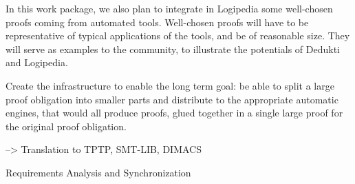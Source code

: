 \begin{workpackage}[id=atpetc,wphases=0-48,type=RTD,
  short=ATPs etc.,%
  title={ATP, SAT, SMT, Model checkers},
  lead=ULi,
  ULiRM=10]
\begin{wpdescription}
In this work package, we also plan to integrate in Logipedia some
well-chosen proofs coming from automated tools.  Well-chosen proofs
will have to be representative of typical applications of the tools,
and be of reasonable size.  They will serve as examples to the
community, to illustrate the potentials of Dedukti and Logipedia.


Create the infrastructure to enable the long term goal: be able to split a large proof
obligation into smaller parts and distribute to the appropriate automatic engines, that
would all produce proofs, glued together in a single large proof for the original proof
obligation.
\end{wpdescription}

\begin{tasklist}
  \begin{task}[id=tools,title=Automatic Tools Exporting Proofs]
  \end{task}

  \begin{task}[id=challenges,title=Logipedia as a Source of Challenges for Automatic Reasoners]
    --> Translation to TPTP, SMT-LIB, DIMACS
  \end{task}
  \begin{task}[id=commang,title=A language for Communication between Automatic Reasoners]
  \end{task}
\end{tasklist}

\begin{wpdelivs}
  \begin{wpdeliv}[due=3,miles=startup,id=requirements,dissem=PU,nature=DEM,lead=ISa]
      {Requirements Analysis and Synchronization}
\end{wpdeliv}
\end{wpdelivs}
\end{workpackage}

